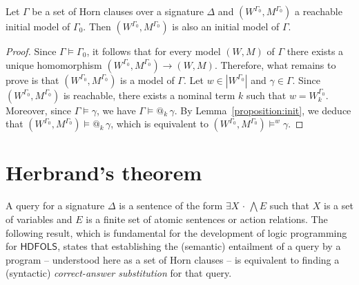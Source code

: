 \documentclass[a4paper,UKenglish,cleveref, autoref]{lipics-v2019}
\makeatletter
\newcommand{\HDFOLS}{{\mathsf{HDFOLS}}}
\renewcommand{\models}{\vDash}
\newcommand{\bigand}{\bigwedge}
\newcommand{\at}[1]{@_{#1}\,}
\newcommand{\Exists}[1]{\exists #1\,{\cdot}\,}
\makeatother
\begin{document}
\begin{theorem} 
  \label{theorem:init}
  Let\/ \(\Gamma\) be a set of Horn clauses over a signature \(\Delta\) and \((W^{\Gamma_{0}}, M^{\Gamma_{0}})\) a reachable initial model of\/ \(\Gamma_{0}\).
  Then \((W^{\Gamma_{0}}, M^{\Gamma_{0}})\) is also an initial model of\/ \(\Gamma\).
\end{theorem}
\begin{proof}
  Since \(\Gamma \models \Gamma_{0}\), it follows that for every model \((W, M)\) of \(\Gamma\) there exists a unique homomorphism \((W^{\Gamma_{0}}, M^{\Gamma_{0}}) \to (W, M)\).
  Therefore, what remains to prove is that \((W^{\Gamma_{0}}, M^{\Gamma_{0}})\) is a model of \(\Gamma\).
  Let \(w \in |W^{\Gamma_{0}}|\) and \(\gamma \in \Gamma\).
  Since \((W^{\Gamma_{0}}, M^{\Gamma_{0}})\) is reachable, there exists a nominal term \(k\) such that \(w = W^{\Gamma_{0}}_{k}\).
  Moreover, since \(\Gamma \models \gamma\), we have \(\Gamma \models \at{k} \gamma\).
  By Lemma~\ref{proposition:init}, we deduce that \((W^{\Gamma_{0}}, M^{\Gamma_{0}}) \models \at{k} \gamma\), which is equivalent to \((W^{\Gamma_{0}}, M^{\Gamma_{0}}) \models^{w} \gamma\).
\end{proof}


\section{Herbrand's theorem}
\label{section:Herbrand-theorem}

A query for a signature \(\Delta\) is a sentence of the form \(\Exists{X} \bigand E\) such that \(X\) is a set of variables and \(E\) is a finite set of atomic sentences or action relations.
The following result, which is fundamental for the development of logic programming for \(\HDFOLS\), states that establishing the (semantic) entailment of a query by a program -- understood here as a set of Horn clauses -- is equivalent to finding a (syntactic) \emph{correct-answer substitution} for that query.
\end{document}
